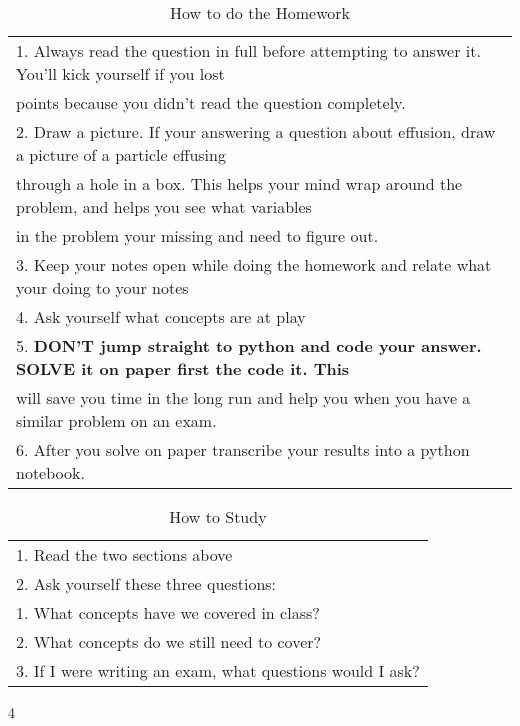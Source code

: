\documentclass[11pt]{article}
\begin{document}
\begin{table}[htbp]
\caption{How to do the Homework}
\centering
\begin{tabular}{l}
\hline
1. Always read the question in full before attempting to answer it. You'll kick yourself if you lost\\
points because you didn't read the question completely.\\
2. Draw a picture. If your answering a question about effusion, draw a picture of a particle effusing\\
through a hole in a box. This helps your mind wrap around the problem, and helps you see what variables\\
in the problem your missing and need to figure out.\\
3. Keep your notes open while doing the homework and relate what your doing to your notes\\
4. Ask yourself what concepts are at play\\
5. \bf{DON'T} jump straight to python and code your answer. \bf{SOLVE} it on paper first the code it. This\\
will save you time in the long run and help you when you have a similar problem on an exam.\\
6. After you solve on paper transcribe your results into a python notebook.\\
\hline
\end{tabular}
\end{table}

\begin{table}[htbp]
\caption{How to Study}
\centering
\begin{tabular}{l}
\hline
1. Read the two sections above\\
2. Ask yourself these three questions:\\
1. What concepts have we covered in class?\\
2. What concepts do we still need to cover?\\
3. If I were writing an exam, what questions would I ask?\\
\hline
\end{tabular}
\end{table}





4
\end{document}
